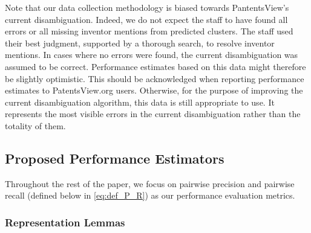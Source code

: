 \documentclass[fontsize=11pt]{article}
\newcommand{\ob}[1]{{\color{purple}#1}}
\theoremstyle{definition}
\begin{document}
Note that our data collection methodology is biased towards PantentsView's current disambiguation. {Indeed, we do not expect the staff to have found all errors or all missing inventor mentions from predicted clusters. The staff used their best judgment, supported by a thorough search, to resolve inventor mentions.} In cases where no errors were found, the current disambiguation was assumed to be correct. Performance estimates based on this data might therefore be slightly optimistic. {This should be acknowledged when reporting performance estimates to PatentsView.org users. Otherwise, for the purpose of improving the current disambiguation \ob{algorithm, this data} is still appropriate to use. It represents the most visible errors in the current disambiguation rather than the totality of them.}

\subsection{Proposed Performance Estimators}\label{sec:proposed_estimators}

Throughout the rest of the paper, we focus on pairwise precision and pairwise recall (defined below in \eqref{eq:def_P_R}) as our performance evaluation metrics. 


\subsubsection{Representation Lemmas}
\end{document}

